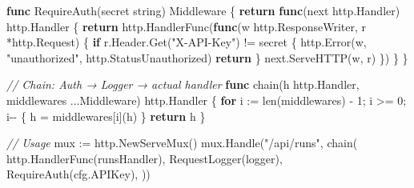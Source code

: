 \documentclass[
]{article}
\newenvironment{Shaded}{}{}
\newcommand{\BuiltInTok}[1]{\textcolor[rgb]{0.00,0.50,0.00}{#1}}
\newcommand{\CommentTok}[1]{\textcolor[rgb]{0.38,0.63,0.69}{\textit{#1}}}
\newcommand{\ControlFlowTok}[1]{\textcolor[rgb]{0.00,0.44,0.13}{\textbf{#1}}}
\newcommand{\DataTypeTok}[1]{\textcolor[rgb]{0.56,0.13,0.00}{#1}}
\newcommand{\DecValTok}[1]{\textcolor[rgb]{0.25,0.63,0.44}{#1}}
\newcommand{\KeywordTok}[1]{\textcolor[rgb]{0.00,0.44,0.13}{\textbf{#1}}}
\newcommand{\NormalTok}[1]{#1}
\newcommand{\OperatorTok}[1]{\textcolor[rgb]{0.40,0.40,0.40}{#1}}
\newcommand{\StringTok}[1]{\textcolor[rgb]{0.25,0.44,0.63}{#1}}
\begin{document}
\begin{Shaded}
\begin{Highlighting}[]
\KeywordTok{func}\NormalTok{ RequireAuth}\OperatorTok{(}\NormalTok{secret }\DataTypeTok{string}\OperatorTok{)}\NormalTok{ Middleware }\OperatorTok{\{}
    \ControlFlowTok{return} \KeywordTok{func}\OperatorTok{(}\NormalTok{next http}\OperatorTok{.}\NormalTok{Handler}\OperatorTok{)}\NormalTok{ http}\OperatorTok{.}\NormalTok{Handler }\OperatorTok{\{}
        \ControlFlowTok{return}\NormalTok{ http}\OperatorTok{.}\NormalTok{HandlerFunc}\OperatorTok{(}\KeywordTok{func}\OperatorTok{(}\NormalTok{w http}\OperatorTok{.}\NormalTok{ResponseWriter}\OperatorTok{,}\NormalTok{ r }\OperatorTok{*}\NormalTok{http}\OperatorTok{.}\NormalTok{Request}\OperatorTok{)} \OperatorTok{\{}
            \ControlFlowTok{if}\NormalTok{ r}\OperatorTok{.}\NormalTok{Header}\OperatorTok{.}\NormalTok{Get}\OperatorTok{(}\StringTok{"X{-}API{-}Key"}\OperatorTok{)} \OperatorTok{!=}\NormalTok{ secret }\OperatorTok{\{}
\NormalTok{                http}\OperatorTok{.}\NormalTok{Error}\OperatorTok{(}\NormalTok{w}\OperatorTok{,} \StringTok{"unauthorized"}\OperatorTok{,}\NormalTok{ http}\OperatorTok{.}\NormalTok{StatusUnauthorized}\OperatorTok{)}
                \ControlFlowTok{return}
            \OperatorTok{\}}
\NormalTok{            next}\OperatorTok{.}\NormalTok{ServeHTTP}\OperatorTok{(}\NormalTok{w}\OperatorTok{,}\NormalTok{ r}\OperatorTok{)}
        \OperatorTok{\})}
    \OperatorTok{\}}
\OperatorTok{\}}

\CommentTok{// Chain: Auth → Logger → actual handler}
\KeywordTok{func}\NormalTok{ chain}\OperatorTok{(}\NormalTok{h http}\OperatorTok{.}\NormalTok{Handler}\OperatorTok{,}\NormalTok{ middlewares }\OperatorTok{...}\NormalTok{Middleware}\OperatorTok{)}\NormalTok{ http}\OperatorTok{.}\NormalTok{Handler }\OperatorTok{\{}
    \ControlFlowTok{for}\NormalTok{ i }\OperatorTok{:=} \BuiltInTok{len}\OperatorTok{(}\NormalTok{middlewares}\OperatorTok{)} \OperatorTok{{-}} \DecValTok{1}\OperatorTok{;}\NormalTok{ i }\OperatorTok{\textgreater{}=} \DecValTok{0}\OperatorTok{;}\NormalTok{ i}\OperatorTok{{-}{-}} \OperatorTok{\{}
\NormalTok{        h }\OperatorTok{=}\NormalTok{ middlewares}\OperatorTok{[}\NormalTok{i}\OperatorTok{](}\NormalTok{h}\OperatorTok{)}
    \OperatorTok{\}}
    \ControlFlowTok{return}\NormalTok{ h}
\OperatorTok{\}}

\CommentTok{// Usage}
\NormalTok{mux }\OperatorTok{:=}\NormalTok{ http}\OperatorTok{.}\NormalTok{NewServeMux}\OperatorTok{()}
\NormalTok{mux}\OperatorTok{.}\NormalTok{Handle}\OperatorTok{(}\StringTok{"/api/runs"}\OperatorTok{,}\NormalTok{ chain}\OperatorTok{(}
\NormalTok{    http}\OperatorTok{.}\NormalTok{HandlerFunc}\OperatorTok{(}\NormalTok{runsHandler}\OperatorTok{),}
\NormalTok{    RequestLogger}\OperatorTok{(}\NormalTok{logger}\OperatorTok{),}
\NormalTok{    RequireAuth}\OperatorTok{(}\NormalTok{cfg}\OperatorTok{.}\NormalTok{APIKey}\OperatorTok{),}
\OperatorTok{))}
\end{Highlighting}
\end{Shaded}
\end{document}
